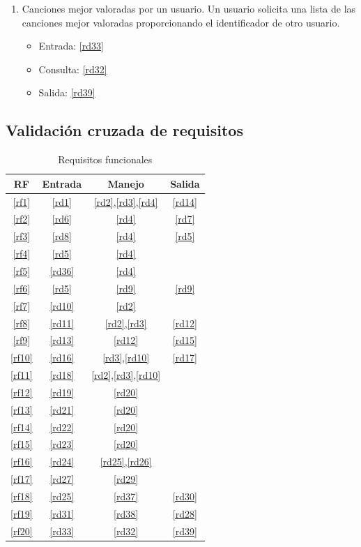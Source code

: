 \documentclass[12pt,a4paper]{article}
\begin{document}
\begin{enumerate}[label=\textnormal{RF\arabic*.}]
	 \item Canciones mejor valoradas por un usuario. Un usuario solicita una lista de las canciones mejor valoradas proporcionando el identificador de otro usuario. \label{rf20}
	 	\begin{itemize}
			\item Entrada:  \ref{rd33}
			\item Consulta: \ref{rd32}
			\item Salida: \ref{rd39}
		\end{itemize}	
   
\end{enumerate}


\subsection{Validación cruzada de requisitos}
\begin{table}[H]
\begin{center}
\begin{tabular}{|c|c|c|c|}
\hline
	RF & Entrada & Manejo & Salida\\
\hline
	\ref{rf1} & \ref{rd1} & \ref{rd2},\ref{rd3},\ref{rd4} & \ref{rd14}\\
\hline
	\ref{rf2} & \ref{rd6} & \ref{rd4} & \ref{rd7}\\
\hline
	\ref{rf3} & \ref{rd8} & \ref{rd4} & \ref{rd5}\\
\hline
	\ref{rf4} & \ref{rd5} & \ref{rd4} & \\
\hline
	\ref{rf5} & \ref{rd36} & \ref{rd4} & \\
\hline
	\ref{rf6} & \ref{rd5} & \ref{rd9} & \ref{rd9}\\
\hline
	\ref{rf7} & \ref{rd10} & \ref{rd2} & \\
\hline
	\ref{rf8} & \ref{rd11} & \ref{rd2},\ref{rd3} & \ref{rd12}\\
\hline
	\ref{rf9} & \ref{rd13} & \ref{rd12} & \ref{rd15}\\
\hline
	\ref{rf10} & \ref{rd16} & \ref{rd3},\ref{rd10} & \ref{rd17}\\
\hline
	\ref{rf11} & \ref{rd18} & \ref{rd2},\ref{rd3},\ref{rd10} & \\
\hline
	\ref{rf12} & \ref{rd19} & \ref{rd20} & \\
\hline
	\ref{rf13} & \ref{rd21} & \ref{rd20} & \\
\hline
	\ref{rf14} & \ref{rd22} & \ref{rd20} & \\
\hline
	\ref{rf15} & \ref{rd23} & \ref{rd20} & \\
\hline
	\ref{rf16} & \ref{rd24} & \ref{rd25},\ref{rd26} & \\
\hline
	\ref{rf17} & \ref{rd27} & \ref{rd29} & \\
\hline
	\ref{rf18} & \ref{rd25} & \ref{rd37} & \ref{rd30}\\
\hline
	\ref{rf19} & \ref{rd31} & \ref{rd38} & \ref{rd28}\\
\hline
	\ref{rf20} & \ref{rd33} & \ref{rd32} & \ref{rd39}\\
\hline
\end{tabular}
\end{center}
\caption{Requisitos funcionales}
\end{table}
\end{document}
